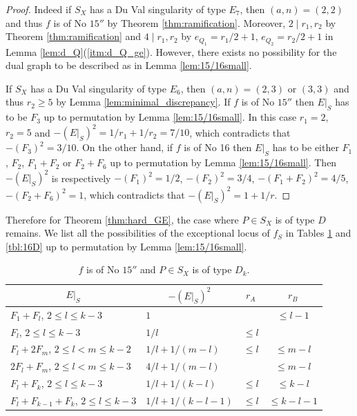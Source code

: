 \documentclass[a4paper,11pt]{amsart}
\theoremstyle{definition}
\theoremstyle{remark}
\numberwithin{equation}{section}
\begin{document}
\begin{proof}
Indeed if $S_X$ has a Du Val singularity of type $E_7$,
then $(a,n)=(2,2)$ and thus $f$ is of No $\textrm{15}''$
by Theorem \ref{thm:ramification}.
Moreover, $2 \mid r_1,r_2$ by Theorem \ref{thm:ramification} and
$4 \mid r_1,r_2$ by $e_{Q_1}=r_1/2+1$, $e_{Q_2}=r_2/2+1$
in Lemma \ref{lem:d_Q}(\ref{itm:d_Q_ge}).
However, there exists no possibility for the dual graph to be described
as in Lemma \ref{lem:15/16small}.

If $S_X$ has a Du Val singularity of type $E_6$,
then $(a,n)=(2,3)$ or $(3,3)$ and thus
$r_2 \ge 5$ by Lemma \ref{lem:minimal_discrepancy}.
If $f$ is of No $\textrm{15}''$ then $E|_S$ has to be $F_3$ up to permutation
by Lemma \ref{lem:15/16small}.
In this case $r_1=2$, $r_2=5$ and $-(E|_S)^2=1/r_1+1/r_2=7/10$,
which contradicts that $-(F_3)^2=3/10$.
On the other hand,
if $f$ is of No 16 then $E|_S$ has to be
either $F_1$, $F_2$, $F_1+F_2$ or $F_2+F_6$ up to permutation
by Lemma \ref{lem:15/16small}.
Then $-(E|_S)^2$ is respectively
$-(F_1)^2=1/2$, $-(F_2)^2=3/4$, $-(F_1+F_2)^2=4/5$, $-(F_2+F_6)^2=1$,
which contradicts that $-(E|_S)^2=1+1/r$.
\end{proof}

Therefore for Theorem \ref{thm:hard_GE},
the case where $P \in S_X$ is of type $D$ remains.
We list all the possibilities of the exceptional locus of $f_S$
in Tables \ref{tbl:15D} and \ref{tbl:16D} up to permutation
by Lemma \ref{lem:15/16small}.

\begin{table}[ht]
\caption{$f$ is of No $\textrm{15}''$
and $P \in S_X$ is of type $D_k$.}\label{tbl:15D}
\begin{tabular}{l|l|c|c}
\hline
\multicolumn{1}{c|}{$E|_S$} & \multicolumn{1}{c|}{$-(E|_S)^2$} &
$r_A$ & $r_B$ \\
\hline
$F_1+F_l$, $2\le l\le k-3$         & $1$             &         & $\le l-1$   \\
$F_l$, $2\le l\le k-3$             & $1/l$           & $\le l$ &             \\
$F_l+2F_m$, $2\le l< m\le k-2$     & $1/l+1/(m-l)$   & $\le l$ & $\le m-l$   \\
$2F_l+F_m$, $2\le l< m\le k-3$     & $4/l+1/(m-l)$   &         & $\le m-l$   \\
$F_l+F_k$, $2\le l\le k-3$         & $1/l+1/(k-l)$   & $\le l$ & $\le k-l$   \\
$F_l+F_{k-1}+F_k$, $2\le l\le k-3$ & $1/l+1/(k-l-1)$ & $\le l$ & $\le k-l-1$ \\
\hline
\end{tabular}
\end{table}
\end{document}
